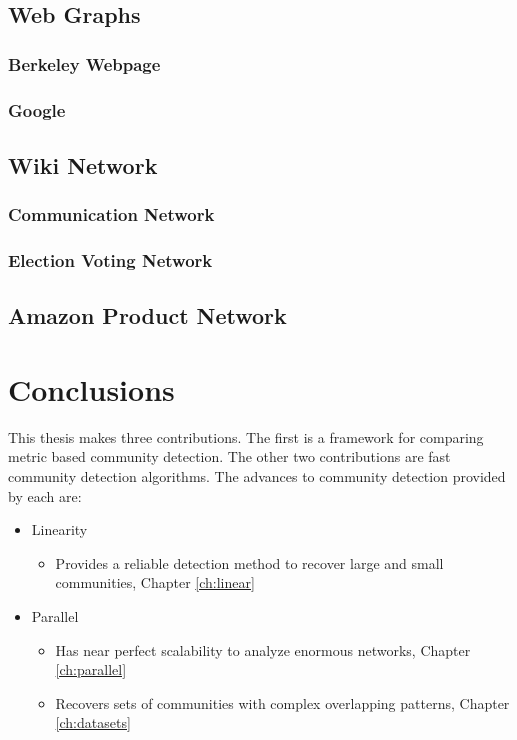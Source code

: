 \documentclass[phd,tocprelim]{cornell}
\begin{document}
\section{Web Graphs}

\subsection{Berkeley Webpage}

\subsection{Google}


\section{Wiki Network}

\subsection{Communication Network}

\subsection{Election Voting Network}



\section{Amazon Product Network}


\chapter{Conclusions}

This thesis makes three contributions.  The first is a framework for comparing metric based community detection.  The other two contributions are fast community detection algorithms.  The advances to community detection provided by each are:
\begin{itemize}
\item {\sc Linearity}
	\begin{itemize}
		\item Provides a reliable detection method to recover large and small communities, Chapter \ref{ch:linear}
	\end{itemize}
\item {\sc Parallel}
	\begin{itemize}
		\item Has near perfect scalability to analyze enormous networks, Chapter \ref{ch:parallel}
		\item Recovers sets of communities with complex overlapping patterns, Chapter \ref{ch:datasets}
	\end{itemize}
\end{itemize}
\end{document}
